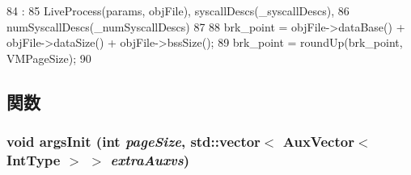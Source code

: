 \begin{DoxyCode}
84                                                           :
85     LiveProcess(params, objFile), syscallDescs(_syscallDescs),
86     numSyscallDescs(_numSyscallDescs)
87 {
88     brk_point = objFile->dataBase() + objFile->dataSize() + objFile->bssSize();
89     brk_point = roundUp(brk_point, VMPageSize);
90 }

\end{DoxyCode}


\subsection{関数}
\hypertarget{classX86ISA_1_1X86LiveProcess_ac7876453870f7620e67298b48c3ec93c}{
\subsubsection[{argsInit}]{\setlength{\rightskip}{0pt plus 5cm}void argsInit (int {\em pageSize}, \/  {\bf std::vector}$<$ {\bf AuxVector}$<$ IntType $>$ $>$ {\em extraAuxvs})}}
\label{classX86ISA_1_1X86LiveProcess_ac7876453870f7620e67298b48c3ec93c}



